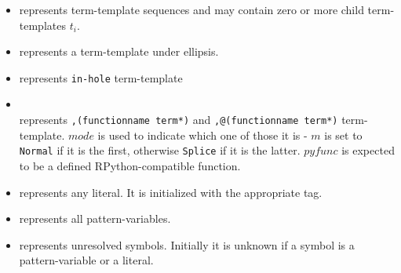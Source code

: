 \begin{itemize}
\item \TermSequence \space represents term-template sequences and may contain zero or more child term-templates $t_i$.
\item \TermRepeat \space represents a term-template under ellipsis.
\item \TermInHole \space represents \texttt{in-hole} term-template
\item \PythonCall \\ represents \texttt{,(functionname term*)} and \texttt{,@(functionname term*)} term-template. $mode$ is used to indicate which one of those it is - $m$ is set to \texttt{Normal} if it is the first, otherwise \texttt{Splice} if it is the latter. $pyfunc$ is expected to be a defined RPython-compatible function.
\item \TermLiteral \space represents any literal. It is initialized with the appropriate tag.
\item \PatternVariable \space represents all pattern-variables.
\item \UnresolvedSymbol \space represents unresolved symbols. Initially it is unknown if a symbol is a pattern-variable or a literal.
\end{itemize}

